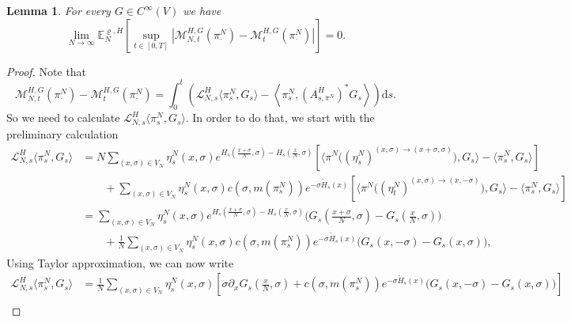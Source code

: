 \documentclass[11pt]{article}
\numberwithin{equation}{section}
\theoremstyle{definition}
\theoremstyle{plain}
\newtheorem{Lemma}[Theorem]{Lemma}
\newcommand{\E}{\mathbb{E}}
\newcommand{\dd}{\mathrm{d}}
\newcommand{\nn}{\nonumber}
\begin{document}
\begin{Lemma}\label{lemma 2.1}
For every $G \in C^\infty(V)$ we have
    \begin{equation}
        \lim_{N\to\infty} \E^{\varrho,H}_N\left[\sup_{t\in[0,T]} \left|\mathscr{M}_{N,t}^{H,G}(\pi^N_{\cdot}) - \mathscr{M}_t^{H,G}(\pi^N_{\cdot})\right|\right] = 0.
    \end{equation}
\end{Lemma}
\begin{proof}
Note that
    \begin{equation}
        \mathscr{M}_{N,t}^{H,G}(\pi^N_{\cdot}) - \mathscr{M}_t^{H,G}(\pi^N_{\cdot}) = \int_0^t\left( \mathscr{L}^H_{N,s} \langle \pi^N_{s},G_s\rangle  - \left\langle \pi^N_{s}, \left(\!A^{H}_{s, \pi^N_\cdot}\!\right)^{\!*} G_s\right\rangle\right) \dd s. 
    \end{equation}
So we need to calculate $ \mathscr{L}^H_{N,s} \langle \pi^N_{s},G_s\rangle $. In order to do that, we start with the preliminary calculation
    \begin{align}
        \mathscr{L}^H_{N,s} \langle \pi^N_{s},G_s\rangle  
        &= N\sum_{(x,\sigma) \in V_N} \eta^N_s(x,\sigma)e^{H_s(\frac{x+\sigma}{N},\sigma) - H_s(\frac{x}{N},\sigma)} \left[ \big\langle\pi^N\big((\eta^N_s)^{(x,\sigma)\to(x+\sigma,\sigma)}\big), G_s\big\rangle- \langle \pi^N_{s}, G_s \rangle  \right]\nonumber\\
        &\qquad  + \sum_{(x,\sigma) \in V_N} \eta_s^N(x,\sigma) c(\sigma,m(\pi^N_s)) e^{-\sigma \widetilde{H}_s(x)}\left[ \big\langle\pi^N\big((\eta^N_t)^{(x,\sigma)\to(x,-\sigma)}\big), G_s\big\rangle - \langle \pi^N_{s},G_s\rangle \right]\nonumber\\
        \nn&=   \sum_{(x,\sigma) \in V_N} \eta^N_s(x,\sigma) e^{H_s(\frac{x+\sigma}{N},\sigma) - H_s(\frac{x}{N},\sigma)}\big(G_s(\tfrac{x+\sigma}{N},\sigma) - G_s(\tfrac{x}{N},\sigma)\big)\\
        &\qquad + \frac{1}{N} \sum_{(x,\sigma)\in V_N} \eta_s^N(x,\sigma) c(\sigma,m(\pi^N_s)) e^{-\sigma \widetilde{H}_s(x)}\big(G_s(x,-\sigma)- G_s(x,\sigma)\big) ,
    \end{align}
 Using Taylor approximation, we can now write 
    \begin{align}\label{Ln}
        \nn \mathscr{L}^H_{N,s}\langle \pi^N_{s},G_s\rangle  &= \frac{1}{N} \sum_{(x,\sigma) \in V_N} \eta^N_s(x,\sigma) \left[\sigma\partial_xG_s(\tfrac{x}{N},\sigma)  + c(\sigma,m(\pi^N_s))e^{-\sigma \widetilde{H}_s(x)}\big(G_s(x,-\sigma)- G_s(x,\sigma)\big) \right]\\

\end{align}
\end{proof}
\end{document}
